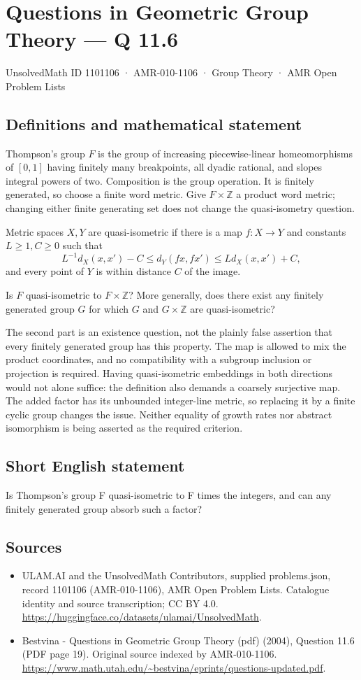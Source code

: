 \documentclass[11pt,a4paper]{article}
\begin{document}
\section*{Questions in Geometric Group Theory — Q 11.6}\label{1101106}
{\small UnsolvedMath ID 1101106 · AMR-010-1106 · Group Theory · AMR Open Problem Lists}
\subsection{Definitions and mathematical statement}
Thompson's group $F$ is the group of increasing piecewise-linear homeomorphisms of $[0,1]$ having finitely many breakpoints, all dyadic rational, and slopes integral powers of two. Composition is the group operation. It is finitely generated, so choose a finite word metric. Give $F\times\mathbb Z$ a product word metric; changing either finite generating set does not change the quasi-isometry question.

Metric spaces $X,Y$ are quasi-isometric if there is a map $f:X\to Y$ and constants $L\geq1,C\geq0$ such that
\[
 L^{-1}d_X(x,x')-C\leq d_Y(fx,fx')\leq Ld_X(x,x')+C,
\]
and every point of $Y$ is within distance $C$ of the image.

Is $F$ quasi-isometric to $F\times\mathbb Z$? More generally, does there exist any finitely generated group $G$ for which $G$ and $G\times\mathbb Z$ are quasi-isometric?

The second part is an existence question, not the plainly false assertion that every finitely generated group has this property. The map is allowed to mix the product coordinates, and no compatibility with a subgroup inclusion or projection is required. Having quasi-isometric embeddings in both directions would not alone suffice: the definition also demands a coarsely surjective map. The added factor has its unbounded integer-line metric, so replacing it by a finite cyclic group changes the issue. Neither equality of growth rates nor abstract isomorphism is being asserted as the required criterion.
\subsection{Short English statement}
Is Thompson’s group F quasi-isometric to F times the integers, and can any finitely generated group absorb such a factor?
\subsection{Sources}
\begin{itemize}
\item[S1] ULAM.AI and the UnsolvedMath Contributors, supplied problems.json, record 1101106 (AMR-010-1106), AMR Open Problem Lists. Catalogue identity and source transcription; CC BY 4.0.
\url{https://huggingface.co/datasets/ulamai/UnsolvedMath}.
\item[S2] Bestvina - Questions in Geometric Group Theory (pdf) (2004), Question 11.6 (PDF page 19). Original source indexed by AMR-010-1106.
\url{https://www.math.utah.edu/~bestvina/eprints/questions-updated.pdf}.
\end{itemize}
\end{document}

